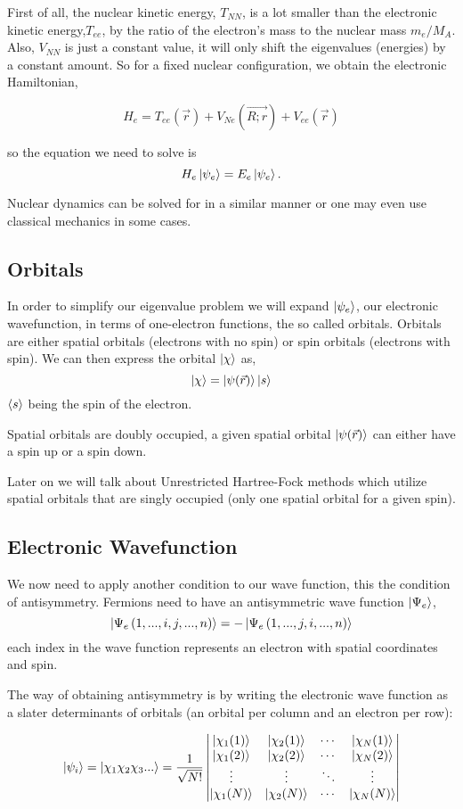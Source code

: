 \documentclass[a4paper]{article}
\begin{document}
First of all, the nuclear kinetic energy, $T_{NN}$, is a lot smaller than the electronic kinetic energy,$T_{ee}$, by the ratio of the electron's mass to the nuclear mass $m_e/M_A$.
Also, $V_{NN}$ is just a constant value, it will only shift the eigenvalues (energies) by a constant amount.
So for a fixed nuclear configuration, we obtain the electronic Hamiltonian,

$$
H_{e} =  T_{ee} (\vec{r}) + V_{Ne} (\vec{R;r}) + V_{ee} (\vec{r})
$$

so the equation we need to solve is
$$
H_e \ket{\psi_e} = E_e \ket{\psi_e}.
$$

Nuclear dynamics can be solved for in a similar manner or one may even use classical mechanics in some cases.


\subsection{Orbitals}
In order to simplify our eigenvalue problem we will expand $\ket{\psi_e}$, our electronic wavefunction, in terms of one-electron functions, the so called orbitals.
Orbitals are either spatial orbitals (electrons with no spin) or spin orbitals (electrons with spin).
We can then express the orbital $\ket{\chi}$ as,
$$ \ket{\chi} = \ket{\psi (\vec{r})} \ket{s} $$
$\braket{s}$ being the spin of the electron.

Spatial orbitals are doubly occupied, a given spatial orbital $\ket{\psi (\vec{r})}$ can either have a spin up or a spin down.

Later on we will talk about Unrestricted Hartree-Fock methods which utilize spatial orbitals that are singly occupied (only one spatial orbital for a given spin).

\subsection{Electronic Wavefunction}
We now need to apply another condition to our wave function, this the condition of antisymmetry.
Fermions need to have an antisymmetric wave function $\ket{\Psi_e}$, 
$$ \ket{\Psi_e\left(1,...,i, j,...,n \right)} = - \ket{\Psi_e\left(1,...,j, i,...,n \right)} $$
each index in the wave function represents an electron with spatial coordinates and spin.

The way of obtaining antisymmetry is by writing the electronic wave function as a slater determinants of orbitals (an orbital per column and an electron per row):

$$
\ket{\psi_i} = \ket{\chi_1 \chi_2 \chi_3 ...}  =
\frac{1}{\sqrt{N!}}
\begin{vmatrix}
\ket{\chi_1 (1)} & \ket{\chi_2 (1)} & \cdots & \ket{\chi_N (1)} \\ 
\ket{\chi_1 (2)} & \ket{\chi_2 (2)} & \cdots & \ket{\chi_N (2)} \\
\vdots & \vdots & \ddots &\vdots \\
\ket{\chi_1 (N)} & \ket{\chi_2 (N)} & \cdots & \ket{\chi_N (N)} \\
\end{vmatrix}
$$
\end{document}
